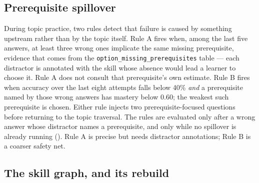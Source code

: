 

\subsection{Prerequisite spillover}

During topic practice, two rules detect that failure is caused by something
upstream rather than by the topic itself. Rule A fires when, among the last five
answers, at least three wrong ones implicate the same missing prerequisite,
evidence that comes from the
\texttt{option\_\allowbreak missing\_\allowbreak prerequisites} table ---
each distractor is annotated with the skill whose absence would lead a learner
to choose it. Rule A does not consult that prerequisite's own estimate. Rule B
fires when accuracy over the last eight attempts falls below 40\% \emph{and} a
prerequisite named by those wrong answers has mastery below 0.60; the weakest
such prerequisite is chosen. Either rule injects two prerequisite-focused
questions before returning to the topic traversal. The rules are evaluated only
after a wrong answer whose distractor names a prerequisite, and only while no
spillover is already running (). Rule A is precise but
needs distractor annotations; Rule B is a coarser safety net.



\subsection{The skill graph, and its rebuild}
\label{sec:ontology-rebuild}

